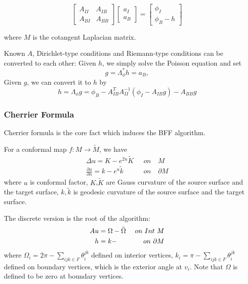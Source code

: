 \begin{equation}
\left[\begin{matrix}
A_{II} & A_{IB}\\
A_{BI} & A_{BB}
\end{matrix}\right] \left[\begin{matrix}
a_I\\
a_B
\end{matrix}\right]
= \left[\begin{matrix}
\phi_I\\
\phi_B - h\end{matrix}\right]
\label{eq:relation}
\end{equation}

where $M$ is the cotangent Laplacian matrix.

Known $A$, Dirichlet-type conditions and Riemann-type conditions can be converted to each other: Given $h$, we simply solve the Poisson equation and set 
\begin{equation}
g = \Lambda^*_\phi h = a_B,
\end{equation}
Given $g$, we can convert it to $h$  by
\begin{equation}
h = \Lambda_\phi g = \phi_B - A_{IB}^TA_{II}^{-1}(\phi_I - A_{IB}g) - A_{BB}g
\end{equation}


\subsubsection{Cherrier Formula}
Cherrier formula \cite{CHERRIER1984154} is the core fact which induces the BFF algorithm. 

For a conformal map $f: M \rightarrow \tilde{M}$, we have 
\begin{equation}
\begin{split}
\Delta u = K - e^{2u} \tilde{K} \ \ \ &on\ &M\,\\
\frac{\partial u}{\partial n} = k - e^{u}\tilde{k} \ \ \ &on\     &\partial M
\end{split}
\end{equation}
where $u$ is conformal factor, $K$,$\tilde{K}$ are Gauss curvature of the source surface and  the target surface, $k, \tilde{k}$ is geodesic curvature of the source surface and the target surface.


The discrete version is the root of the algorithm:
\begin{equation}
\begin{split}
Au &=   \Omega - \tilde\Omega\  &on\  Int\  M\\
h &= k - \title{k}\ \  &on\ \partial M 
\end{split}
\label{eq:poisson}
\end{equation}
where $\Omega_i = 2\pi - \sum_{ijk \in F}\theta_i^{jk}$ defined on interior vertices, $k_i = \pi - \sum_{ijk \in F}\theta_i^{jk}$ defined on boundary vertices, which is the exterior angle at $v_i$. Note that $\Omega$ is defined to be zero at boundary vertices.



